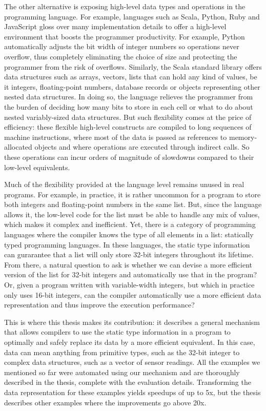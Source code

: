 The other alternative is exposing high-level data types and operations in the programming language. For example, languages such as Scala, Python, Ruby and JavaScript gloss over many implementation details to offer a high-level environment that boosts the programmer productivity. For example, Python automatically adjusts the bit width of integer numbers so operations never overflow, thus completely eliminating the choice of size and protecting the programmer from the risk of overflows. Similarly, the Scala standard library offers data structures such as arrays, vectors, lists that can hold any kind of values, be it integers, floating-point numbers, database records or objects representing other nested data structures. In doing so, the language relieves the programmer from the burden of deciding how many bits to store in each cell or what to do about nested variably-sized data structures. But such flexibility comes at the price of efficiency: these flexible high-level constructs are compiled to long sequences of machine instructions, where most of the data is passed as references to memory-allocated objects and where operations are executed through indirect calls. So these operations can incur orders of magnitude of slowdowns compared to their low-level equivalents.

Much of the flexibility provided at the language level remains unused in real programs. For example, in practice, it is rather uncommon for a program to store both integers and floating-point numbers in the same list. But, since the language allows it, the low-level code for the list must be able to handle any mix of values, which makes it complex and inefficient. Yet, there is a category of programming languages where the compiler knows the type of all elements in a list: statically typed programming languages. In these languages, the static type information can gurarantee that a list will only store 32-bit integers throughout its lifetime. From there, a natural question to ask is whether we can devise a more efficient version of the list for 32-bit integers and automatically use that in the program? Or, given a program written with variable-width integers, but which in practice only uses 16-bit integers, can the compiler automatically use a more efficient data representation and thus improve the execution performance?

This is where this thesis makes its contribution: it describes a general mechanism that allows compilers to use the static type information in a program to optimally and safely replace its data by a more efficient equivalent. In this case, data can mean anything from primitive types, such as the 32-bit integer to complex data structures, such as a vector of sensor readings. All the examples we mentioned so far were automated using our mechanism and are thoroughly described in the thesis, complete with the evaluation details. Transforming the data representation for these examples yields speedups of up to 5x, but the thesis describes other examples where the improvements go above 20x.

